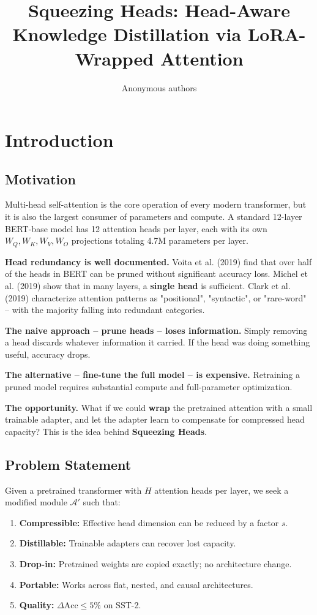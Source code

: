 \title{\textbf{Squeezing Heads: Head-Aware Knowledge Distillation via LoRA-Wrapped Attention}}

\author{Anonymous authors}



\section{Introduction}

\subsection{Motivation}

Multi-head self-attention is the core operation of every modern transformer, 
but it is also the largest consumer of parameters and compute. A standard 
12-layer BERT-base model has 12 attention heads per layer, each with its own 
$W_Q, W_K, W_V, W_O$ projections totaling 4.7M parameters per layer.

\textbf{Head redundancy is well documented.} Voita et al. (2019) find that over 
half of the heads in BERT can be pruned without significant accuracy loss. 
Michel et al. (2019) show that in many layers, a \textbf{single head} is 
sufficient. Clark et al. (2019) characterize attention patterns as 
"positional", "syntactic", or "rare-word" -- with the majority falling into 
redundant categories.

\textbf{The naive approach -- prune heads -- loses information.} Simply removing 
a head discards whatever information it carried. If the head was doing 
something useful, accuracy drops.

\textbf{The alternative -- fine-tune the full model -- is expensive.} Retraining a 
pruned model requires substantial compute and full-parameter optimization.

\textbf{The opportunity.} What if we could \textbf{wrap} the pretrained attention with 
a small trainable adapter, and let the adapter learn to compensate for 
compressed head capacity? This is the idea behind \textbf{Squeezing Heads}.

\subsection{Problem Statement}

Given a pretrained transformer with $H$ attention heads per layer, we seek 
a modified module $\mathcal{A}'$ such that:

\begin{enumerate}
\item \textbf{Compressible:} Effective head dimension can be reduced by a factor $s$.
\item \textbf{Distillable:} Trainable adapters can recover lost capacity.
\item \textbf{Drop-in:} Pretrained weights are copied exactly; no architecture change.
\item \textbf{Portable:} Works across flat, nested, and causal architectures.
\item \textbf{Quality:} $\Delta\text{Acc} \leq 5\%$ on SST-2.

\end{enumerate}
